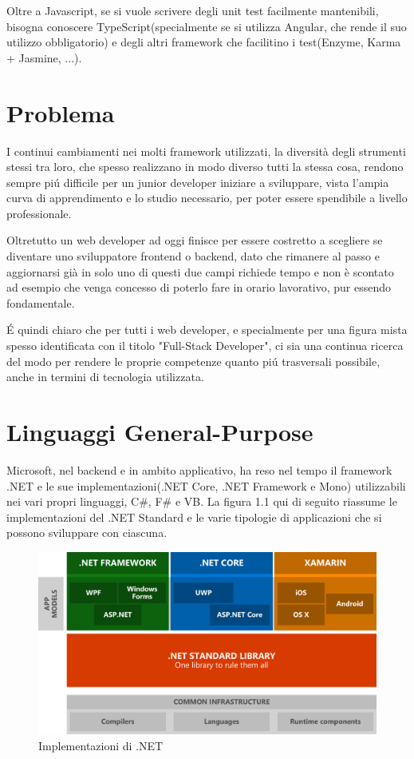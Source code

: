 Oltre a Javascript, se si vuole scrivere degli unit test facilmente mantenibili, bisogna conoscere TypeScript(specialmente se si utilizza Angular, che rende il suo utilizzo obbligatorio) e degli altri framework che facilitino i test(Enzyme, Karma + Jasmine, ...).

\section{Problema}\label{sez:problema}
I continui cambiamenti nei molti framework utilizzati, la diversit\`a degli strumenti stessi tra loro, che spesso realizzano in modo diverso tutti la stessa cosa, rendono sempre pi\'u difficile per un junior developer iniziare a sviluppare, vista l'ampia curva di apprendimento e lo studio necessario, per poter essere spendibile a livello professionale.

Oltretutto un web developer ad oggi finisce per essere costretto a scegliere se diventare uno sviluppatore frontend o backend, dato che rimanere al passo e aggiornarsi gi\`a in solo uno di questi due campi richiede tempo e non \`e scontato ad esempio che venga concesso di poterlo fare in orario lavorativo, pur essendo fondamentale.

\'E quindi chiaro che per tutti i web developer, e specialmente per una figura mista spesso identificata con il titolo "Full-Stack Developer", ci sia una continua ricerca del modo per rendere le proprie competenze quanto pi\'u trasversali possibile, anche in termini di tecnologia utilizzata.

\pagebreak

\section{Linguaggi General-Purpose}\label{sez:problema}
Microsoft, nel backend e in ambito applicativo, ha reso nel tempo il framework .NET e le sue implementazioni(.NET Core, .NET Framework e Mono) utilizzabili nei vari propri linguaggi, C\#, F\# e VB.
La figura 1.1 qui di seguito riassume le implementazioni del .NET Standard e le varie tipologie di applicazioni che si possono sviluppare con ciascuna.

\begin{figure}[H]
	\centerline{\includegraphics[scale=0.2]{figure/DotNetImplementations}}
	\caption{Implementazioni di .NET}
	\label{fig:DotNetImplementations}
\end{figure}

